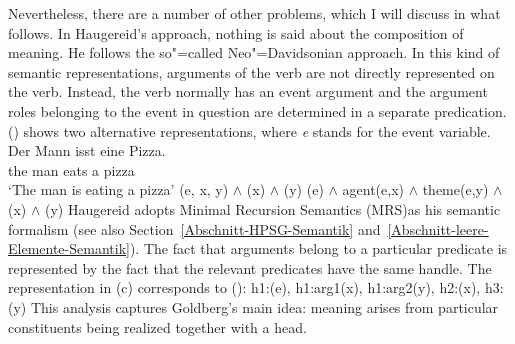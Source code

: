 \begin{exe}
\begin{xlist}[iv.]
\begin{exe}
\begin{xlist}[iv.]
Nevertheless, there are a number of other problems, which I will discuss in what follows.
In Haugereid's approach, nothing is said about the composition of meaning. He follows the so"=called Neo"=Davidsonian approach.
In this kind of semantic representations, arguments of the verb are not directly represented on the verb.
Instead, the verb normally has an event argument and the argument roles belonging to the event in question are determined in a separate predication.
() shows two alternative representations, where \emph{e} stands for the event variable.
\eal
\ex 
\gll Der Mann isst eine Pizza.\\
	 the man eats a pizza\\
\glt `The man is eating a pizza'
\ex {}(e, x, y) $\wedge$ (x) $\wedge$ (y)
\ex {}(e) $\wedge$ agent(e,x) $\wedge$ theme(e,y) $\wedge$ (x) $\wedge$ (y)
\zl
Haugereid adopts Minimal Recursion Semantics (MRS)\indexmrs as his semantic formalism (see also Section~\ref{Abschnitt-HPSG-Semantik} and~\ref{Abschnitt-leere-Elemente-Semantik}). 
The fact that arguments belong to a particular predicate is represented by the fact that the relevant predicates have the same handle. The representation in (c) corresponds
to ():
\ea
h1:(e), h1:arg1(x), h1:arg2(y), h2:(x), h3:(y)
\z
This analysis captures Goldberg's main idea: meaning arises from particular constituents being realized together with a head.


\end{xlist}
\end{exe}
\end{xlist}
\end{exe}
